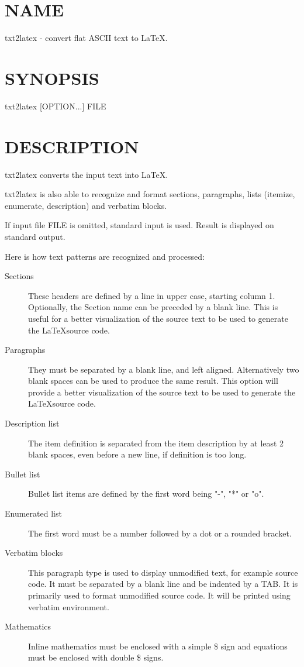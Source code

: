 \section{NAME}
txt2latex - convert flat ASCII text to \LaTeX.

\section{SYNOPSIS}
txt2latex [OPTION...] FILE 

\section{DESCRIPTION}
txt2latex converts the input text into \LaTeX. 

txt2latex is also able to recognize and format sections, paragraphs,
lists (itemize, enumerate, description) and verbatim blocks.

If input file FILE is omitted, standard input is used. 
Result is displayed on standard output. 

Here is how text patterns are recognized and processed:
\begin{description}
\item[Sections] These headers are defined by a line in upper case, starting
                column 1. 
                Optionally, the Section name can be preceded by a blank line. 
                This is useful for a better visualization of the source 
                text to be used to generate the \LaTeX source code.
\item[Paragraphs] They must be separated by a blank line, and left aligned.
                  Alternatively two blank spaces can be used to produce the
                  same result. This option will provide a better visualization
                  of the source text to be used to generate the \LaTeX source code.
\item[Description list] 
                        The item definition is separated from the item description
                        by at least 2 blank spaces, even before a new line, if
                        definition is too long.
\item[Bullet list] 
                   Bullet list items are defined by the first word being "-",
                   "*" or "o".
\item[Enumerated list] 
                       The first word must be a number followed by a dot or a rounded bracket.
\item[Verbatim blocks] 
                       This paragraph type is used to display unmodified text,
                       for example source code. It must be separated by a blank
                       line and be indented by a TAB. It is primarily used to format
                       unmodified source code. It will be printed using verbatim environment.
\item[Mathematics] 
                   Inline mathematics must be enclosed with a simple \$ sign
                   and equations must be enclosed with double \$ signs.
\end{description}
              
